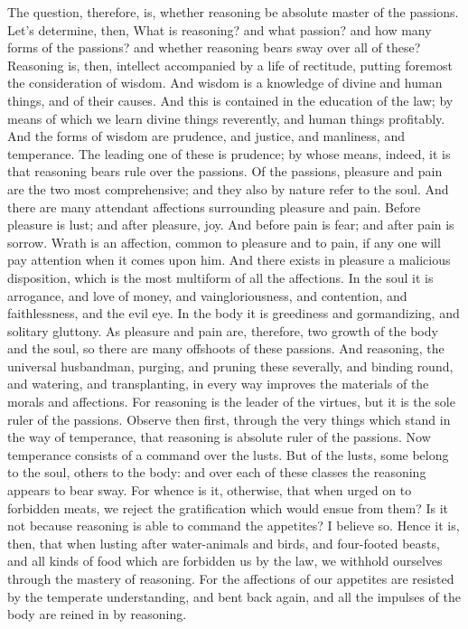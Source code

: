 {The question, therefore, is, whether reasoning be absolute master of the passions.
Let’s determine, then, What is reasoning? and what passion? and how many forms of the passions? and whether reasoning bears sway over all of these?
Reasoning is, then, intellect accompanied by a life of rectitude, putting foremost the consideration of wisdom.
And wisdom is a knowledge of divine and human things, and of their causes.
And this is contained in the education of the law; by means of which we learn divine things reverently, and human things profitably.
And the forms of wisdom are prudence, and justice, and manliness, and temperance.
The leading one of these is prudence; by whose means, indeed, it is that reasoning bears rule over the passions.
Of the passions, pleasure and pain are the two most comprehensive; and they also by nature refer to the soul.
And there are many attendant affections surrounding pleasure and pain.
Before pleasure is lust; and after pleasure, joy.
And before pain is fear; and after pain is sorrow.
Wrath is an affection, common to pleasure and to pain, if any one will pay attention when it comes upon him.
And there exists in pleasure a malicious disposition, which is the most multiform of all the affections.
In the soul it is arrogance, and love of money, and vaingloriousness, and contention, and faithlessness, and the evil eye.
In the body it is greediness and gormandizing, and solitary gluttony.
As pleasure and pain are, therefore, two growth of the body and the soul, so there are many offshoots of these passions.
And reasoning, the universal husbandman, purging, and pruning these severally, and binding round, and watering, and transplanting, in every way improves the materials of the morals and affections.
For reasoning is the leader of the virtues, but it is the sole ruler of the passions. Observe then first, through the very things which stand in the way of temperance, that reasoning is absolute ruler of the passions.
Now temperance consists of a command over the lusts.
But of the lusts, some belong to the soul, others to the body: and over each of these classes the reasoning appears to bear sway.
For whence is it, otherwise, that when urged on to forbidden meats, we reject the gratification which would ensue from them? Is it not because reasoning is able to command the appetites? I believe so.
Hence it is, then, that when lusting after water-animals and birds, and four-footed beasts, and all kinds of food which are forbidden us by the law, we withhold ourselves through the mastery of reasoning.
For the affections of our appetites are resisted by the temperate understanding, and bent back again, and all the impulses of the body are reined in by reasoning.

}

